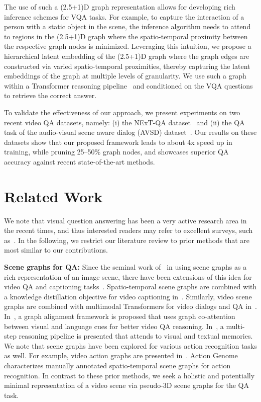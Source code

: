 \documentclass[letterpaper]{article} \usepackage{aaai22}  \usepackage{times}  \usepackage{helvet}  \usepackage{courier}  \usepackage[hyphens]{url}  \usepackage{graphicx} \urlstyle{rm} \def\UrlFont{\rm}  \usepackage{natbib}  \usepackage{caption} \DeclareCaptionStyle{ruled}{labelfont=normalfont,labelsep=colon,strut=off} \frenchspacing  \setlength{\pdfpagewidth}{8.5in}  \setlength{\pdfpageheight}{11in}  \usepackage{algorithm}
\newcommand{\name}{(2.5+1)D\xspace}
\begin{document}
The use of such a \name graph representation allows for developing rich inference schemes for VQA tasks. For example, to capture the interaction of a person with a static object in the scene, the inference algorithm needs to attend to regions in the \name graph where the spatio-temporal proximity between the respective graph nodes is minimized. Leveraging this intuition, we propose a hierarchical latent embedding of the \name graph where the graph edges are constructed via varied spatio-temporal proximities, thereby capturing the latent embeddings of the graph at multiple levels of granularity. We use such a graph within a Transformer reasoning pipeline~\cite{vaswani2017attention} and conditioned on the VQA questions to retrieve the correct answer. 

To validate the effectiveness of our approach, we present experiments on two recent video QA datasets, namely: (i) the NExT-QA dataset~\cite{xiao2021next} and (ii) the QA task of the audio-visual scene aware dialog (AVSD) dataset~\cite{alamri2019audio}. Our results on these datasets show that our proposed framework leads to about 4x speed up in training, while pruning 25--50\% graph nodes, and showcases superior QA accuracy against recent state-of-the-art methods.  

\section{Related Work}
 We note that visual question answering has been a very active research area in the recent times, and thus interested readers may refer to excellent surveys, such as~\cite{teney2018tips,wu2017visual}. In the following, we restrict our literature review to prior methods that are most similar to our contributions.
 
\noindent\textbf{Scene graphs for QA:} Since the seminal work of~\cite{johnson2015image} in using scene graphs as a rich representation of an image scene, there have been extensions of this idea for video QA and captioning tasks~\cite{herzig2019spatio,wang2018non,jang2017tgif,tsai2019video,girdhar2019video}. Spatio-temporal scene graphs are combined with a knowledge distillation objective for video captioning in~\cite{pan2020spatio}. Similarly, video scene graphs are combined with multimodal Transformers for video dialogs and QA in~\cite{geng2021dynamic}. In~\cite{Jiang_Gao_Guo_Zhang_Xiang_Pan_2019}, a graph alignment framework is proposed that uses graph co-attention between visual and language cues for better video QA reasoning. In~\cite{fan2019heterogeneous}, a multi-step reasoning pipeline is presented that attends to visual and textual memories. We note that scene graphs have been explored for various action recognition tasks as well. For example, video action graphs are presented in~\cite{bar2020compositional,rashid2020action,Wang2018videos}. Action Genome~\cite{ji2019action,cong2021spatial} characterizes manually annotated spatio-temporal scene graphs for action recognition. In contrast to these prior methods, we seek a holistic and potentially minimal representation of a video scene via pseudo-3D scene graphs for the QA task.
\end{document}
